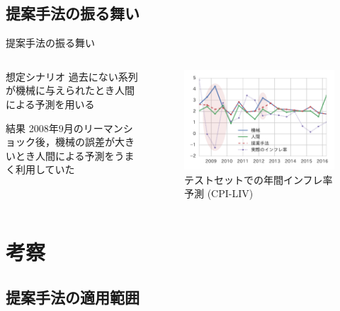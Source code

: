 \documentclass[dvipdfmx,aspectratio=169]{beamer}
\begin{document}
\subsection{提案手法の振る舞い}

\begin{frame}{提案手法の振る舞い}
\begin{columns}
  \begin{column}{0.4\textwidth}
    \begin{block}{想定シナリオ}
      過去にない系列が機械に与えられたとき人間による予測を用いる
    \end{block}
    \begin{alertblock}{結果}
      \alert{2008年9月のリーマンショック後，機械の誤差が大きいとき人間による予測をうまく利用していた}
    \end{alertblock}
  \end{column}
  \begin{column}{0.6\textwidth}
    \begin{figure}
      \centering
      \includegraphics[width=\columnwidth]{slide-behavior.pdf}
      \caption{テストセットでの年間インフレ率予測 (CPI-LIV)}
    \end{figure}
  \end{column}
\end{columns}
\end{frame}

\section{考察}

\subsection{提案手法の適用範囲}
\end{document}
